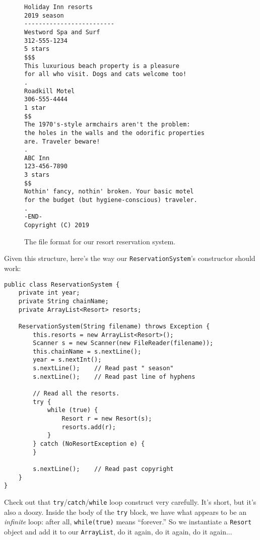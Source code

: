 \begin{figure}[ht]
\centering
\begin{Verbatim}[fontsize=\scriptsize,samepage=true,frame=lines]
Holiday Inn resorts
2019 season
-------------------------
Westword Spa and Surf
312-555-1234
5 stars
$$$
This luxurious beach property is a pleasure
for all who visit. Dogs and cats welcome too!
.
Roadkill Motel
306-555-4444
1 star
$$
The 1970's-style armchairs aren't the problem:
the holes in the walls and the odorific properties
are. Traveler beware!
.
ABC Inn
123-456-7890
3 stars
$$  
Nothin' fancy, nothin' broken. Your basic motel 
for the budget (but hygiene-conscious) traveler.
.   
-END- 
Copyright (C) 2019
\end{Verbatim}
\caption{The file format for our resort reservation system.}
\label{fig:wholeFile}
\end{figure}

Given this structure, here's the way our \texttt{ReservationSystem}'s
constructor should work:

\begin{Verbatim}[fontsize=\footnotesize,samepage=true,frame=single]
public class ReservationSystem {
    private int year;
    private String chainName;
    private ArrayList<Resort> resorts;

    ReservationSystem(String filename) throws Exception {
        this.resorts = new ArrayList<Resort>();
        Scanner s = new Scanner(new FileReader(filename));
        this.chainName = s.nextLine();
        year = s.nextInt();
        s.nextLine();    // Read past " season"
        s.nextLine();    // Read past line of hyphens

        // Read all the resorts.
        try {
            while (true) {
                Resort r = new Resort(s);
                resorts.add(r);
            }
        } catch (NoResortException e) {
        }

        s.nextLine();    // Read past copyright
    }
}
\end{Verbatim}

Check out that \texttt{try}/\texttt{catch}/\texttt{while} loop construct
very carefully. It's short, but it's also a doozy. Inside the body of the
\texttt{try} block, we have what appears to be an \textit{infinite} loop:
after all, \texttt{while(true)} means ``forever.'' So we instantiate a
\texttt{Resort} object and add it to our \texttt{ArrayList}, do it again, do
it again, do it again...

